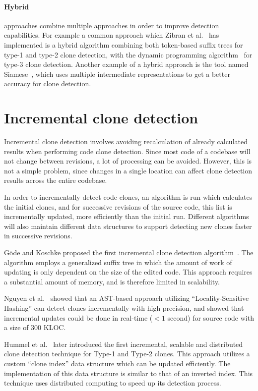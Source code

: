 \paragraph{Hybrid} approaches combine multiple approaches in order to improve detection
capabilities. For example a common approach which Zibran et
al.~\cite{Zibran_real_time_search} has implemented is a hybrid algorithm combining both
token-based suffix trees for type-1 and type-2 clone detection, with the dynamic
programming algorithm~\cite{BakerSparseDynamicProgramming} for type-3 clone detection.
Another example of a hybrid approach is the tool named
Siamese~\cite{SiameseScalableAndIncrementalClone}, which uses multiple intermediate
representations to get a better accuracy for clone detection.


\section{Incremental clone detection}

Incremental clone detection involves avoiding recalculation of already calculated results
when performing code clone detection. Since most code of a codebase will not change
between revisions, a lot of processing can be avoided. However, this is not a simple
problem, since changes in a single location can affect clone detection results across the
entire codebase.

In order to incrementally detect code clones, an algorithm is run which calculates the
initial clones, and for successive revisions of the source code, this list is
incrementally updated, more efficiently than the initial run. Different algorithms will
also maintain different data structures to support detecting new clones faster in
successive revisions.

Göde and Koschke proposed the first incremental clone detection
algorithm~\cite{GodeIncrementalCloneDetection}. The algorithm employs a generalized suffix
tree in which the amount of work of updating is only dependent on the size of the edited
code. This approach requires a substantial amount of memory, and is therefore limited in
scalability.

Nguyen et al.~\cite{LocalitySensitiveHashingIncremental} showed that an AST-based approach
utilizing ``Locality-Sensitive Hashing'' can detect clones incrementally with high
precision, and showed that incremental updates could be done in real-time ($< 1$ second)
for source code with a size of 300 KLOC.

Hummel et al.~\cite{IndexBasedIncrementalCloneDetection} later introduced the first incremental,
scalable and distributed clone detection technique for Type-1 and Type-2 clones. This
approach utilizes a custom ``clone index'' data structure which can be updated
efficiently. The implementation of this data structure is similar to that of an inverted
index. This technique uses distributed computing to speed up its detection process.

